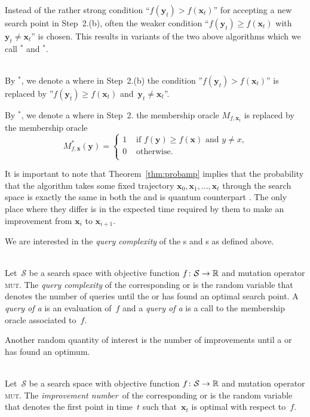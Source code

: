 Instead of the rather strong condition ``$f(\mathbf{y}_t)> f(\mathbf{x}_t)$'' for accepting a new search point in Step~2.(b), often the weaker condition ``$f(\mathbf{y}_t) \geq f(\mathbf{x}_t)$ with~$\mathbf{y}_t\neq\mathbf{x}_t$'' is chosen. This results in variants of the two above algorithms which we call \rsh{}$^*$ and \qrsh{}$^*$.
\begin{algorithm}~\\
By \rsh{}$^*$, we denote a \rsh{} where in Step~2.(b) the condition ''$f(\mathbf{y}_t)> f(\mathbf{x}_t)$''   is replaced by ''$f(\mathbf{y}_t) \geq f(\mathbf{x}_t)$ and~$\mathbf{y}_t\neq\mathbf{x}_t$''.

By \qrsh{}$^*$, we denote a \qrsh{} where in Step~2. the membership oracle $M_{f,\mathbf{x}_t}$ is replaced by the membership oracle
\[
M^*_{f,\mathbf{x}}(\mathbf{y}) = \left\{ \begin{array}{ll}
 1 & \textrm{ if } f(\mathbf{y})\ge f(\mathbf{x})\textrm{ and }y\neq x\textrm{,}\\
 0 & \textrm{ otherwise. }\\
 \end{array}\right.
\]
\end{algorithm}

It is important to note that Theorem~\ref{thm:probamp} implies that the probability that the algorithm takes some fixed trajectory $\mathbf{x}_0, \mathbf{x}_1,\ldots, \mathbf{x}_t$ through the search space is exactly the same in both the \rsh and is quantum counterpart \qrsh. The only place where they differ is in the expected time required by them to make an improvement from $\mathbf{x}_i$ to $\mathbf{x}_{i+1}$.

We are interested in the \emph{query complexity} of the \rsh{}s and \qrsh{}s as defined above.
\begin{definition}~\\
Let~$\mathcal{S}$ be a search space with objective function $f\colon \mathcal{S}\to\mathbb{R}$ and mutation operator \textsc{mut}. The \emph{query complexity} of the corresponding \rsh or \qrsh is the random variable that denotes the number of queries until the \rsh or \qrsh has found an optimal search point. A \emph{query of a \rsh} is an evaluation of~$f$ and a \emph{query of a \qrsh} is a call to the membership oracle associated to~$f$.
\end{definition}


Another random quantity of interest is the %
number of improvements until a \rsh or \qrsh has found an optimum.
\begin{definition}~\\
Let~$\mathcal{S}$ be a search space with objective function $f\colon
\mathcal{S}\to\mathbb{R}$ and mutation operator \textsc{mut}. 
The \emph{improvement number}~\TOPT of the corresponding \rsh or \qrsh
is the random variable that denotes the first point in time~$t$ such
that~$\mathbf{x}_t$ is optimal with respect to~$f$.
\end{definition}

